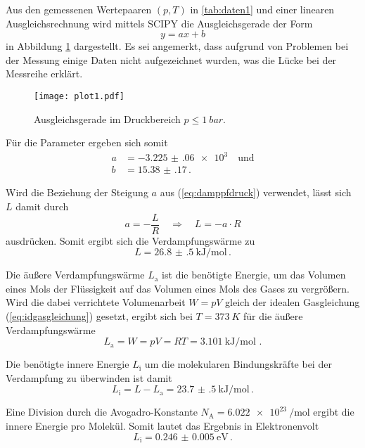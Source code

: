 Aus den gemessenen Wertepaaren $(p,T)$ in \autoref{tab:daten1} und einer linearen Ausgleichsrechnung
wird mittels SCIPY \cite{scipy} die Ausgleichsgerade der Form
\begin{equation}
    y = ax + b 
\end{equation}
in Abbildung \ref{fig:plot1} dargestellt.
Es sei angemerkt, dass aufgrund von Problemen bei der Messung einige Daten nicht aufgezeichnet wurden,
was die Lücke bei der Messreihe erklärt.
\begin{figure}[H]
    \centering
    \texttt{[image: plot1.pdf]}
    \caption{Ausgleichsgerade im Druckbereich $p \leq \qty{1}{bar}$.}
    \label{fig:plot1}
\end{figure}

Für die Parameter ergeben sich somit
\begin{align*}
    a &= \num{-3.225(060)e3} \quad \text{und} \\
    b &= \num{15.38(17)} \, .
\end{align*}

Wird die Beziehung der Steigung $a$ aus (\ref{eq:damppfdruck}) verwendet, lässt sich $L$ damit durch
\begin{equation}
    a = -\frac{L}{R} \quad \Rightarrow \quad L=-a \cdot R
\end{equation}
ausdrücken. 
Somit ergibt sich die Verdampfungswärme zu
\begin{equation}
    L = \qty{26.8(5)}{\kilo\joule\per\mol} \, .
\end{equation}

Die äußere Verdampfungswärme $L_\text{a}$ ist die benötigte Energie, 
um das Volumen eines Mols der Flüssigkeit auf das Volumen eines Mols des Gases zu vergrößern.
Wird die dabei verrichtete Volumenarbeit $W = pV$  gleich der idealen Gasgleichung (\ref{eq:idgasgleichung})
gesetzt, ergibt sich bei $T = \qty{373}{K}$ für die äußere Verdampfungswärme
\begin{equation}
    L_{\text{a}} = W = pV = RT = \qty{3.101}{\kilo\joule\per\mol} \text{ .}
\end{equation}

Die benötigte innere Energie $L_\text{i}$ um die molekularen Bindungskräfte bei der Verdampfung zu überwinden ist damit
\begin{equation}
    L_{\mathrm{i}} = L-L_{\mathrm{a}} = \qty{23.7(5)}{\kilo\joule\per\mol} \, .
\end{equation}

Eine Division durch die Avogadro-Konstante $N_\text{A} = \qty{6.022e23}{\per\mol}$
ergibt die innere Energie pro Molekül. Somit lautet das Ergebnis in Elektronenvolt
\begin{equation}
    L_{\text{i}} = \qty{0.246(5)}{\eV} \, .
\end{equation}


